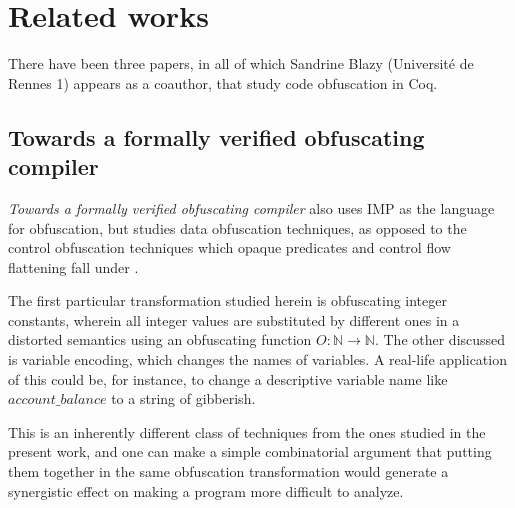 \documentclass[compsoc,conference,a4paper,10pt,times]{IEEEtran}
\begin{document}
\section{Related works}
There have been three papers, in all of which Sandrine Blazy (Universit\'{e} de Rennes 1) appears as a coauthor, that study code obfuscation in Coq.

\subsection*{Towards a formally verified obfuscating compiler}
\par \emph{Towards a formally verified obfuscating compiler} \cite{Blazy1} also uses IMP as the language for obfuscation, but studies data obfuscation techniques, as opposed to the control obfuscation techniques which opaque predicates and control flow flattening fall under \cite{CollbergTax}.
\par The first particular transformation studied herein is obfuscating integer constants, wherein all integer values are substituted by different ones in a distorted semantics using an obfuscating function $O: \mathbb{N} \to \mathbb{N}$.  The other discussed is variable encoding, which changes the names of variables.  A real-life application of this could be, for instance, to change a descriptive variable name like $account\_balance$ to a string of gibberish.
\par This is an inherently different class of techniques from the ones studied in the present work, and one can make a simple combinatorial argument that putting them together in the same obfuscation transformation would generate a synergistic effect on making a program more difficult to analyze.
\end{document}
